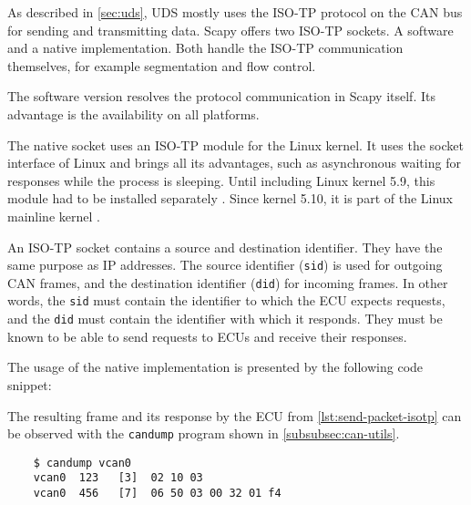 As described in \autoref{sec:uds}, UDS mostly uses the ISO-TP protocol on the CAN bus for sending and transmitting data.
Scapy offers two ISO-TP sockets. A software and a native implementation. Both handle the ISO-TP communication themselves, for example segmentation and flow control.

The software version resolves the protocol communication in Scapy itself. Its advantage is the availability on all platforms.

The native socket uses an ISO-TP module for the Linux kernel. It uses the socket interface of Linux and brings all its advantages, such as asynchronous waiting for responses while the process is sleeping. Until including Linux kernel 5.9, this module had to be installed separately \cite{isotp-module}. Since kernel 5.10, it is part of the Linux mainline kernel \cite{isotp-commit}.

An ISO-TP socket contains a source and destination identifier. They have the same purpose as IP addresses. The source identifier (\texttt{sid}) is used for outgoing CAN frames, and the destination identifier (\texttt{did}) for incoming frames. In other words, the \texttt{sid} must contain the identifier to which the ECU expects requests, and the \texttt{did} must contain the identifier with which it responds. They must be known to be able to send requests to ECUs and receive their responses.

The usage of the native implementation is presented by the following code snippet:


The resulting frame and its response by the ECU from \autoref{lst:send-packet-isotp} can be observed with the \texttt{candump} program shown in \autoref{subsubsec:can-utils}. 

\begin{samepage}
\begin{verbatim}
    $ candump vcan0
    vcan0  123   [3]  02 10 03
    vcan0  456   [7]  06 50 03 00 32 01 f4
\end{verbatim}
\end{samepage}

